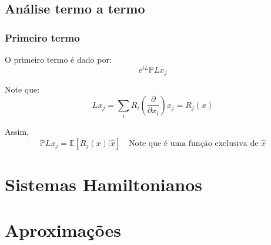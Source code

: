 \documentclass[12pt]{article}
\begin{document}
\subsection{Análise termo a termo}
\subsubsection{Primeiro termo}
O primeiro termo é dado por:
\begin{equation}
    e^{tL} \mathbb{P}L x_j
    \label{eq:primeiro-termo-mz}
\end{equation}

Note que: 
\begin{equation*}
    Lx_j = \sum_i R_i\left(\frac{\partial}{\partial x_i}\right)x_j = R_j(x)
\end{equation*}

Assim,
\begin{equation*}
    \mathbb{P}Lx_j = \mathbb{E}[R_j(x)|\hat{x}] \quad \text{Note que é uma função exclusiva de $\hat{x}$}
\end{equation*}

\appendix
\section{Sistemas Hamiltonianos}


\section{Aproximações}
\newpage
\nocite{*}
\printbibliography
\end{document}

